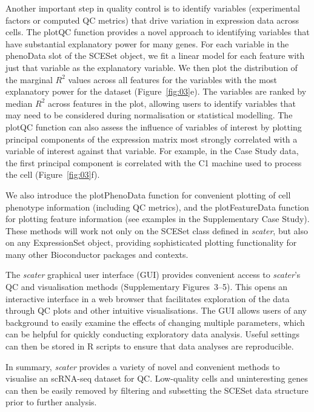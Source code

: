 \documentclass{bioinfo}
\begin{document}
Another important step in quality control is to identify variables (experimental factors or computed QC metrics) that drive variation in expression data across cells. The plotQC function
provides a novel approach to identifying variables that
have substantial explanatory power for many genes. For each variable in
the phenoData slot of the SCESet object, we fit a linear model for each
feature with just that variable as the explanatory variable. We then plot the distribution of the marginal $R^2$ values across all features for the variables with the most
explanatory power for the dataset (Figure~\ref{fig:03}e). The variables are ranked by median $R^2$ across features in the plot, allowing users to identify variables that may need to be considered
during normalisation or statistical modelling. The plotQC function can
also assess the influence of variables of interest by plotting principal
components of the expression matrix most strongly correlated with a
variable of interest against that variable. For example, in the Case
Study data, the first principal component is correlated with the
C1 machine used to process the cell (Figure~\ref{fig:03}f).

We also introduce the plotPhenoData function for convenient plotting of
cell phenotype information (including QC metrics), and the
plotFeatureData function for plotting feature information (see examples in the
Supplementary Case Study). These methods will work not only on the
SCESet class defined in \emph{scater}, but also on any ExpressionSet object,
providing sophisticated plotting functionality for many other Bioconductor
packages and contexts.

The \emph{scater} graphical user interface (GUI) provides convenient
access to \emph{scater}'s QC and visualisation methods (Supplementary
Figures~3--5). This opens an interactive interface in a web browser that facilitates exploration of the data through QC plots and other intuitive visualisations. The GUI allows users of any background to easily examine the effects of changing multiple parameters, which can be helpful for quickly conducting exploratory data analysis. Useful settings can then be stored in R scripts to ensure that data analyses are reproducible.

In summary, \emph{scater} provides a variety of novel and convenient
methods to visualise an scRNA-seq dataset for QC. Low-quality cells and
uninteresting genes can then be easily removed by filtering and
subsetting the SCESet data structure prior to further analysis.
\end{document}
